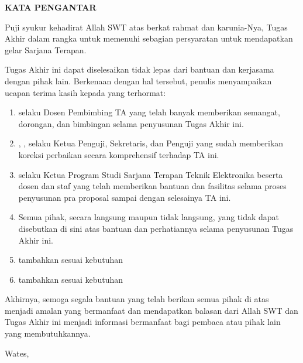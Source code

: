 
\clearpage
{}
{}
\begin{center}
    \textbf{\large KATA PENGANTAR}\\[3em]
\end{center}

Puji syukur kehadirat Allah SWT atas berkat rahmat dan karunia-Nya, Tugas Akhir dalam rangka untuk memenuhi sebagian persyaratan untuk mendapatkan gelar Sarjana Terapan.

Tugas Akhir ini dapat diselesaikan tidak lepas dari bantuan dan kerjasama dengan pihak lain. Berkenaan dengan hal tersebut, penulis menyampaikan ucapan terima kasih kepada yang terhormat:

\begin{enumerate}
    \item {\pembimbing} selaku Dosen Pembimbing TA yang telah banyak memberikan semangat, dorongan, dan bimbingan selama penyusunan Tugas Akhir ini.
    \item {\pembimbing}, {\pengujiSatu}, {\pengujiDua} selaku Ketua Penguji, Sekretaris, dan Penguji yang sudah  memberikan koreksi perbaikan secara komprehensif terhadap TA ini.
    \item {\koorprodi} selaku Ketua Program Studi Sarjana Terapan Teknik Elektronika beserta dosen dan staf yang telah memberikan bantuan dan fasilitas selama proses penyusunan pra proposal sampai dengan selesainya TA ini.
    \item Semua pihak, secara langsung maupun tidak langsung, yang tidak dapat disebutkan di sini atas bantuan dan perhatiannya selama penyusunan Tugas Akhir ini.
    \item tambahkan sesuai kebutuhan
    \item tambahkan sesuai kebutuhan
\end{enumerate}

Akhirnya, semoga segala bantuan yang telah berikan semua pihak di atas menjadi amalan yang bermanfaat dan mendapatkan balasan dari Allah SWT dan Tugas Akhir ini menjadi informasi bermanfaat bagi pembaca atau pihak lain yang membutuhkannya.

\begin{flushright}
    Wates, \tglpengesahan\\[1.25cm]
    \penulis \\
    \nim
\end{flushright}
